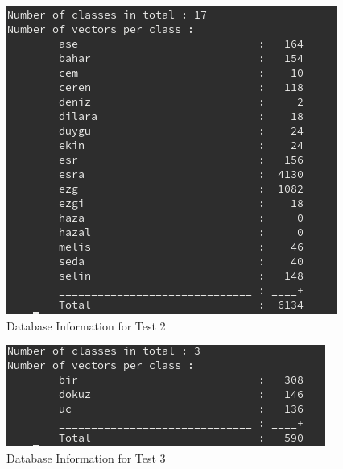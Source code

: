 \begin{figure}
    \centering
    \includegraphics[width=\linewidth]{content/040_image_processing/identification/img/databaseTest3.png}
    \caption{Database Information for Test 2}
    \label{fig:databaseInfo2}
\end{figure}

\begin{figure}
    \centering
    \includegraphics[width=\linewidth]{content/040_image_processing/identification/img/databaseTest4.png}
    \caption{Database Information for Test 3}
    \label{fig:databaseInfo3}
\end{figure}


